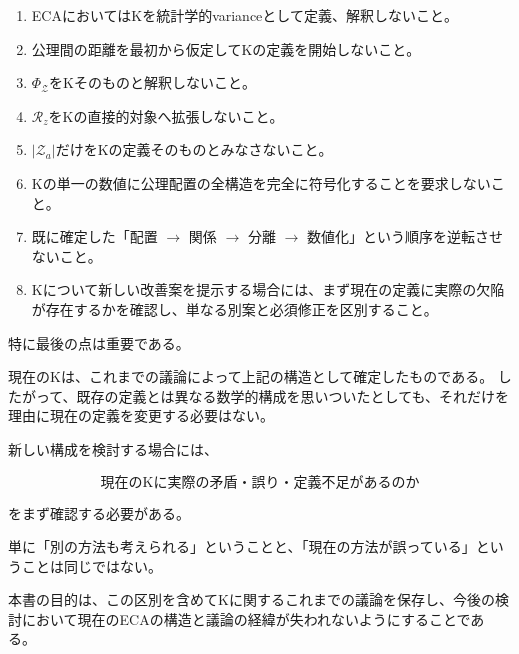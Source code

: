 \begin{enumerate}
  \item ECAにおいてはKを統計学的varianceとして定義、解釈しないこと。
  \item 公理間の距離を最初から仮定してKの定義を開始しないこと。
  \item $\Phi_{\mathcal{Z}}$をKそのものと解釈しないこと。
  \item $\mathcal{R}_z$をKの直接的対象へ拡張しないこと。
  \item $|\mathcal{Z}_a|$だけをKの定義そのものとみなさないこと。
  \item Kの単一の数値に公理配置の全構造を完全に符号化することを要求しないこと。
  \item 既に確定した「配置 $\rightarrow$ 関係 $\rightarrow$ 分離 $\rightarrow$ 数値化」という順序を逆転させないこと。
  \item Kについて新しい改善案を提示する場合には、まず現在の定義に実際の欠陥が存在するかを確認し、単なる別案と必須修正を区別すること。
\end{enumerate}

特に最後の点は重要である。

現在のKは、これまでの議論によって上記の構造として確定したものである。
したがって、既存の定義とは異なる数学的構成を思いついたとしても、それだけを理由に現在の定義を変更する必要はない。

新しい構成を検討する場合には、

\[
\boxed{
\text{現在のKに実際の矛盾・誤り・定義不足があるのか}
}
\]

をまず確認する必要がある。

単に「別の方法も考えられる」ということと、「現在の方法が誤っている」ということは同じではない。

本書の目的は、この区別を含めてKに関するこれまでの議論を保存し、今後の検討において現在のECAの構造と議論の経緯が失われないようにすることである。